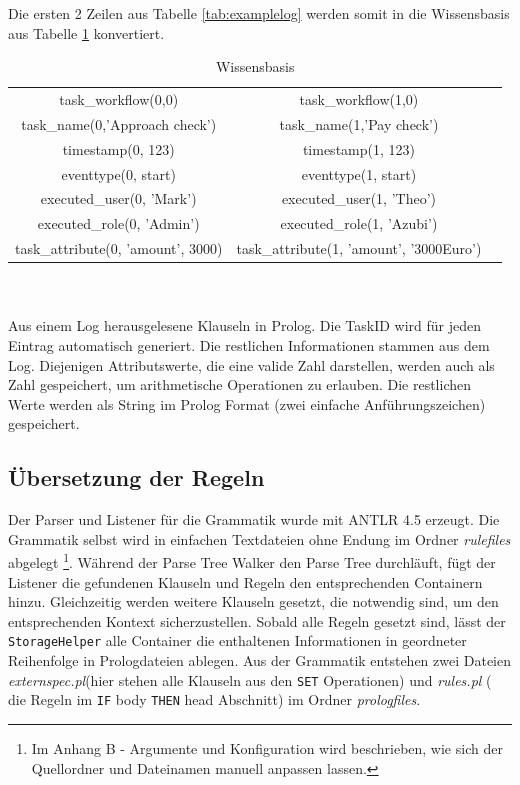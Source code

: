 \newpage
Die ersten 2 Zeilen aus Tabelle \ref{tab:examplelog} werden somit in die Wissensbasis aus Tabelle \ref{tab:knowledge} konvertiert.
\begin{table}[h!]
\begin{tabular}{ccc}
task{\_}workflow(0,0)&task{\_}workflow(1,0)\\
task{\_}name(0,'Approach check')&task{\_}name(1,'Pay check')\\
timestamp(0, 123)&timestamp(1, 123)\\
eventtype(0, start)&eventtype(1, start)\\
executed{\_}user(0, 'Mark')&executed{\_}user(1, 'Theo')\\
executed{\_}role(0, 'Admin')&executed{\_}role(1, 'Azubi')\\
task\_attribute(0, 'amount', 3000)& task\_attribute(1, 'amount', '3000Euro')\\
\end{tabular}\\\\
\small Aus einem Log herausgelesene Klauseln in Prolog. Die TaskID wird für jeden Eintrag automatisch generiert. Die restlichen Informationen stammen aus dem Log. Diejenigen Attributswerte, die eine valide Zahl darstellen, werden auch als Zahl gespeichert, um arithmetische Operationen zu erlauben. Die restlichen Werte werden als String im Prolog Format (zwei einfache Anführungszeichen) gespeichert. 
\caption{Wissensbasis}
\label{tab:knowledge}
\end{table}


%
%
\subsection{Übersetzung der Regeln}
\label{sec:constraintreader}

Der Parser und Listener für die Grammatik wurde mit ANTLR 4.5 \cite{antlr} erzeugt. Die Grammatik selbst wird in einfachen Textdateien ohne Endung im Ordner \textit{rulefiles} abgelegt \footnote{Im Anhang B - Argumente und Konfiguration wird beschrieben, wie sich der Quellordner und Dateinamen manuell anpassen lassen.}. Während der Parse Tree Walker den Parse Tree durchläuft, fügt der Listener die gefundenen Klauseln und Regeln den entsprechenden Containern hinzu. Gleichzeitig werden weitere Klauseln gesetzt, die notwendig sind, um den entsprechenden Kontext sicherzustellen. Sobald alle Regeln gesetzt sind, lässt der \texttt{StorageHelper} alle Container die enthaltenen Informationen in geordneter Reihenfolge in Prologdateien ablegen. Aus der Grammatik entstehen zwei Dateien \textit{externspec.pl}(hier stehen alle Klauseln aus den \texttt{SET} Operationen) und \textit{rules.pl} ( die Regeln im \texttt{IF} body \texttt{THEN} head Abschnitt) im Ordner \textit{prologfiles}.\\

